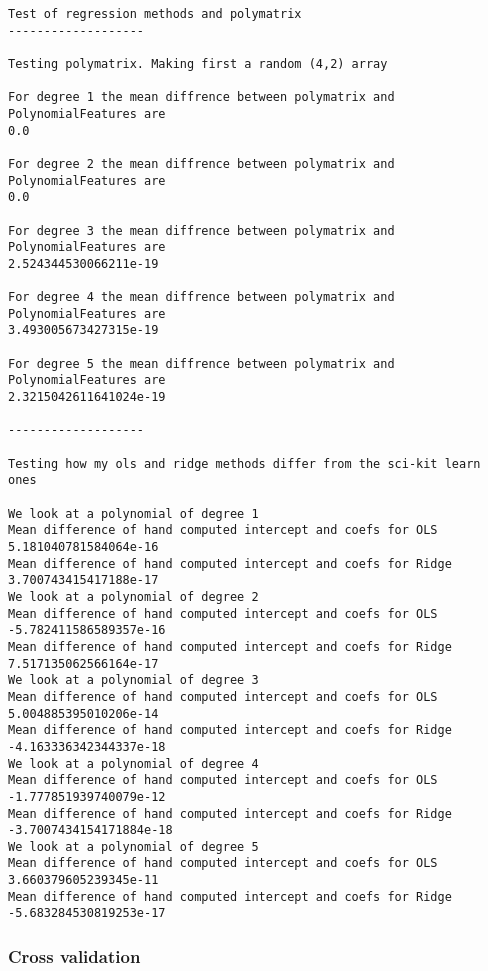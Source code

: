 \documentclass[11pt]{article}
\begin{document}
    \begin{Verbatim}[commandchars=\\\{\}]
Test of regression methods and polymatrix
-------------------

Testing polymatrix. Making first a random (4,2) array

For degree 1 the mean diffrence between polymatrix and PolynomialFeatures are
0.0

For degree 2 the mean diffrence between polymatrix and PolynomialFeatures are
0.0

For degree 3 the mean diffrence between polymatrix and PolynomialFeatures are
2.524344530066211e-19

For degree 4 the mean diffrence between polymatrix and PolynomialFeatures are
3.493005673427315e-19

For degree 5 the mean diffrence between polymatrix and PolynomialFeatures are
2.3215042611641024e-19

-------------------

Testing how my ols and ridge methods differ from the sci-kit learn ones

We look at a polynomial of degree 1
Mean difference of hand computed intercept and coefs for OLS
5.181040781584064e-16
Mean difference of hand computed intercept and coefs for Ridge
3.700743415417188e-17
We look at a polynomial of degree 2
Mean difference of hand computed intercept and coefs for OLS
-5.782411586589357e-16
Mean difference of hand computed intercept and coefs for Ridge
7.517135062566164e-17
We look at a polynomial of degree 3
Mean difference of hand computed intercept and coefs for OLS
5.004885395010206e-14
Mean difference of hand computed intercept and coefs for Ridge
-4.163336342344337e-18
We look at a polynomial of degree 4
Mean difference of hand computed intercept and coefs for OLS
-1.777851939740079e-12
Mean difference of hand computed intercept and coefs for Ridge
-3.7007434154171884e-18
We look at a polynomial of degree 5
Mean difference of hand computed intercept and coefs for OLS
3.660379605239345e-11
Mean difference of hand computed intercept and coefs for Ridge
-5.683284530819253e-17

    \end{Verbatim}

    \subsubsection{Cross validation}\label{cross-validation}
\end{document}
